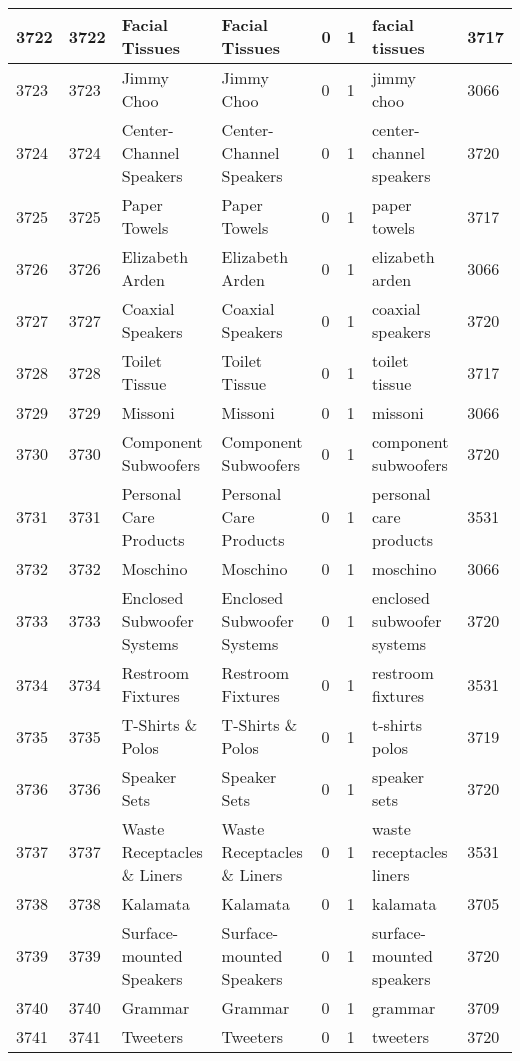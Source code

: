 \begin{longtable}{|l|l|l|l|l|l|l|l|}
3722 & 3722 & Facial Tissues & Facial Tissues & 0 & 1 & facial tissues & 3717 \\ \hline 
3723 & 3723 & Jimmy Choo & Jimmy Choo & 0 & 1 & jimmy choo & 3066 \\ \hline 
3724 & 3724 & Center-Channel Speakers & Center-Channel Speakers & 0 & 1 & center-channel speakers & 3720 \\ \hline 
3725 & 3725 & Paper Towels & Paper Towels & 0 & 1 & paper towels & 3717 \\ \hline 
3726 & 3726 & Elizabeth Arden & Elizabeth Arden & 0 & 1 & elizabeth arden & 3066 \\ \hline 
3727 & 3727 & Coaxial Speakers & Coaxial Speakers & 0 & 1 & coaxial speakers & 3720 \\ \hline 
3728 & 3728 & Toilet Tissue & Toilet Tissue & 0 & 1 & toilet tissue & 3717 \\ \hline 
3729 & 3729 & Missoni & Missoni & 0 & 1 & missoni & 3066 \\ \hline 
3730 & 3730 & Component Subwoofers & Component Subwoofers & 0 & 1 & component subwoofers & 3720 \\ \hline 
3731 & 3731 & Personal Care Products & Personal Care Products & 0 & 1 & personal care products & 3531 \\ \hline 
3732 & 3732 & Moschino & Moschino & 0 & 1 & moschino & 3066 \\ \hline 
3733 & 3733 & Enclosed Subwoofer Systems & Enclosed Subwoofer Systems & 0 & 1 & enclosed subwoofer systems & 3720 \\ \hline 
3734 & 3734 & Restroom Fixtures & Restroom Fixtures & 0 & 1 & restroom fixtures & 3531 \\ \hline 
3735 & 3735 & T-Shirts \& Polos & T-Shirts \& Polos & 0 & 1 & t-shirts polos & 3719 \\ \hline 
3736 & 3736 & Speaker Sets & Speaker Sets & 0 & 1 & speaker sets & 3720 \\ \hline 
3737 & 3737 & Waste Receptacles \& Liners & Waste Receptacles \& Liners & 0 & 1 & waste receptacles liners & 3531 \\ \hline 
3738 & 3738 & Kalamata & Kalamata & 0 & 1 & kalamata & 3705 \\ \hline 
3739 & 3739 & Surface-mounted Speakers & Surface-mounted Speakers & 0 & 1 & surface-mounted speakers & 3720 \\ \hline 
3740 & 3740 & Grammar & Grammar & 0 & 1 & grammar & 3709 \\ \hline 
3741 & 3741 & Tweeters & Tweeters & 0 & 1 & tweeters & 3720 \\ \hline 

\end{longtable}

